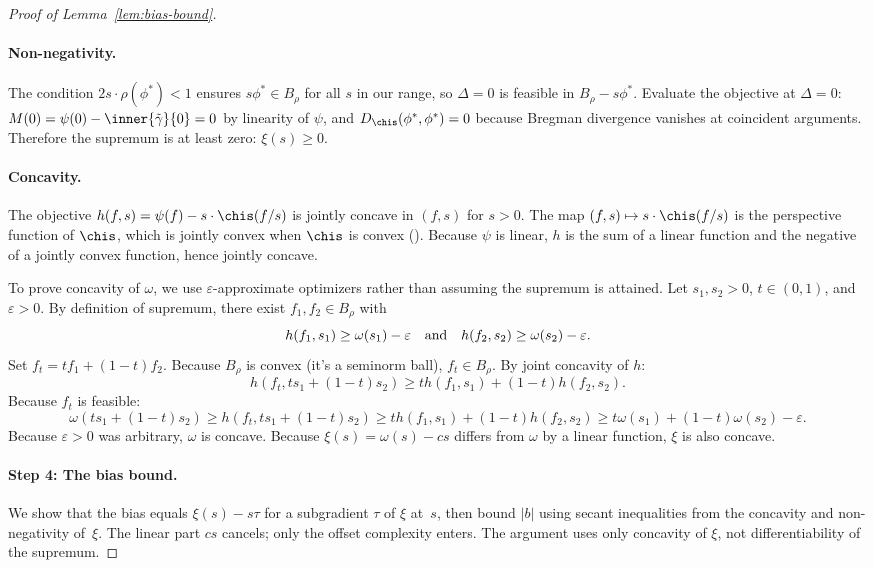 \documentclass{article}
\begin{document}
\begin{proof}[Proof of Lemma~\ref{lem:bias-bound}]
\paragraph{Non-negativity.} The condition $2s \cdot \rho(\phi^*) < 1$ ensures $s\phi^* \in B_\rho$ for all $s$ in our range, so $\Delta = 0$ is feasible in $B_\rho - s\phi^*$. Evaluate the objective at $\Delta = 0$: $M(0) = \psi(0) - \inner{\tilde\gamma}{0} = 0$ by linearity of $\psi$, and $D_{\chis}(\phi^*, \phi^*) = 0$ because Bregman divergence vanishes at coincident arguments. Therefore the supremum is at least zero: $\xi(s) \ge 0$.

\paragraph{Concavity.} The objective $h(f, s) = \psi(f) - s \cdot \chis(f/s)$ is jointly concave in $(f, s)$ for $s > 0$. The map $(f, s) \mapsto s \cdot \chis(f/s)$ is the perspective function of $\chis$, which is jointly convex when $\chis$ is convex (). Because $\psi$ is linear, $h$ is the sum of a linear function and the negative of a jointly convex function, hence jointly concave.

To prove concavity of $\omega$, we use $\varepsilon$-approximate optimizers rather than assuming the supremum is attained. Let $s_1, s_2 > 0$, $t \in (0,1)$, and $\varepsilon > 0$. By definition of supremum, there exist $f_1, f_2 \in B_\rho$ with
\[
h(f_1, s_1) \ge \omega(s_1) - \varepsilon \qand h(f_2, s_2) \ge \omega(s_2) - \varepsilon.
\]
Set $f_t = t f_1 + (1-t)f_2$. Because $B_\rho$ is convex (it's a seminorm ball), $f_t \in B_\rho$. By joint concavity of $h$:
\[
h(f_t, t s_1 + (1-t)s_2) \ge t h(f_1, s_1) + (1-t)h(f_2, s_2).
\]
Because $f_t$ is feasible:
\[
\omega(t s_1 + (1-t)s_2) \ge h(f_t, t s_1 + (1-t)s_2) \ge t h(f_1, s_1) + (1-t)h(f_2, s_2) \ge t\omega(s_1) + (1-t)\omega(s_2) - \varepsilon.
\]
Because $\varepsilon > 0$ was arbitrary, $\omega$ is concave. Because $\xi(s) = \omega(s) - cs$ differs from $\omega$ by a linear function, $\xi$ is also concave.

\paragraph{Step 4: The bias bound.} We show that the bias equals $\xi(s) - s\tau$
for a subgradient $\tau$ of $\xi$ at~$s$,
then bound $|b|$ using secant inequalities
from the concavity and non-negativity of~$\xi$.
The linear part $cs$ cancels;
only the offset complexity enters.
The argument uses only concavity of $\xi$, not differentiability of the supremum.


\end{proof}
\end{document}
